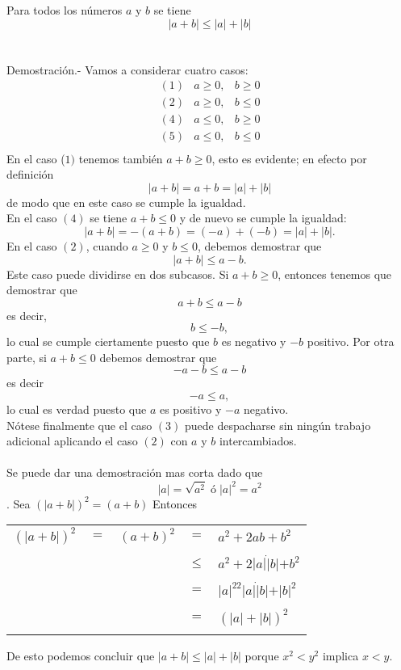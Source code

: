 \begin{teo}
Para todos los números $a$ y $b$ se tiene $$|a+b|\leq |a| + |b|$$\\\\
    Demostración.- \; Vamos a considerar cuatro casos:
    $$
    \begin{array}{crr}
	(1)&a\geq 0,&b \geq 0\\
	(2)&a\geq 0,&b\leq 0\\
	(4)&a\leq 0,&b \geq 0\\
	(5)&a\leq 0,&b \leq 0\\
    \end{array}
    $$
En el caso ($1)$ tenemos también $a+b\geq 0$, esto es evidente; en efecto por definición $$|a+b|=a+b=|a|+|b|$$ de modo que en este caso se cumple la igualdad.\\
En el caso $(4)$ se tiene $a+b\leq 0$ y de nuevo se cumple la igualdad: 
$$|a+b|=-(a+b)=(-a)+(-b)=|a|+|b|.$$
En el caso $(2)$, cuando $a\geq 0$ y $b\leq 0$, debemos demostrar que 
$$|a+b|\leq a - b.$$ 
Este caso puede dividirse en dos subcasos. Si $a+b\geq 0$, entonces tenemos que demostrar que $$a+b \leq a-b$$ es decir, $$b\leq -b,$$  lo cual se cumple ciertamente puesto que $b$ es negativo y $-b$ positivo. Por otra parte, si $a+b\leq 0$ debemos demostrar que $$-a-b\leq a-b$$ es decir $$-a\leq a,$$ lo cual es verdad puesto que $a$ es positivo y \; $-a$ negativo.\\
Nótese finalmente que el caso $(3)$ puede despacharse sin ningún trabajo adicional aplicando el caso $(2)$ con $a$ \; y \; $b$ intercambiados.\\\\ 
Se puede dar una demostración mas corta dado que $$|a|=\sqrt{a^2} \; ó \; |a|^2=a^2$$. Sea $(|a+b|)^2=(a+b)$ Entonces 
\begin{center}
\begin{tabular}{r c r c l}
$(|a+b|)^2$&$=$&$(a+b)^2$&$=$&$a^2+2ab+b^2$\\\\
&&&$\leq$&$a^2+2|a|\dot |b|+b^2$\\\\
&&&$=$&$|a|^22|a|\dot |b|+|b|^2$\\\\
&&&$=$&$(|a|+|b|)^2$\\\\
\end{tabular}
\end{center}
De esto podemos concluir que $|a+b|\leq |a|+|b|$ porque $x^2<y^2$ implica $x<y$.
\end{teo}


